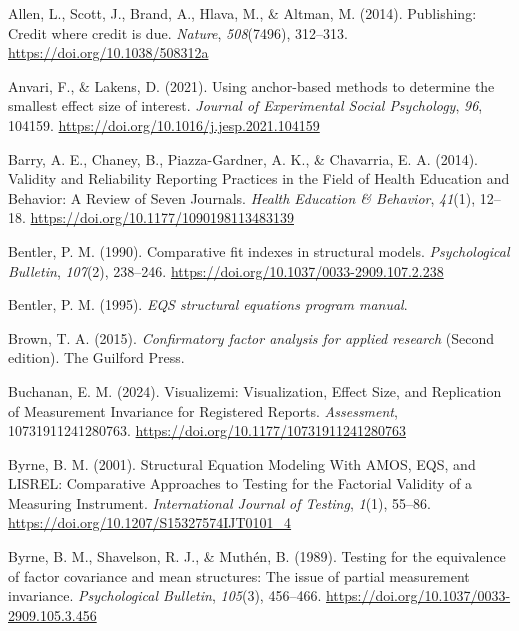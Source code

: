 \documentclass[
  english,
  man]{apa7}
\newlength{\cslhangindent}
\newenvironment{CSLReferences}[2] %
 {\begin{list}{}{%
  \setlength{\itemindent}{0pt}
  \setlength{\leftmargin}{0pt}
  \setlength{\parsep}{0pt}
  \ifodd #1
   \setlength{\leftmargin}{\cslhangindent}
   \setlength{\itemindent}{-1\cslhangindent}
  \fi
  \setlength{\itemsep}{#2\baselineskip}}}
 {\end{list}}
\begin{document}
\label{refs}
\begin{CSLReferences}{1}{0}
Allen, L., Scott, J., Brand, A., Hlava, M., \& Altman, M. (2014). Publishing: Credit where credit is due. \emph{Nature}, \emph{508}(7496), 312--313. \url{https://doi.org/10.1038/508312a}

Anvari, F., \& Lakens, D. (2021). Using anchor-based methods to determine the smallest effect size of interest. \emph{Journal of Experimental Social Psychology}, \emph{96}, 104159. \url{https://doi.org/10.1016/j.jesp.2021.104159}

Barry, A. E., Chaney, B., Piazza-Gardner, A. K., \& Chavarria, E. A. (2014). Validity and Reliability Reporting Practices in the Field of Health Education and Behavior: A Review of Seven Journals. \emph{Health Education \& Behavior}, \emph{41}(1), 12--18. \url{https://doi.org/10.1177/1090198113483139}

Bentler, P. M. (1990). Comparative fit indexes in structural models. \emph{Psychological Bulletin}, \emph{107}(2), 238--246. \url{https://doi.org/10.1037/0033-2909.107.2.238}

Bentler, P. M. (1995). \emph{EQS structural equations program manual}.

Brown, T. A. (2015). \emph{Confirmatory factor analysis for applied research} (Second edition). The Guilford Press.

Buchanan, E. M. (2024). Visualizemi: Visualization, Effect Size, and Replication of Measurement Invariance for Registered Reports. \emph{Assessment}, 10731911241280763. \url{https://doi.org/10.1177/10731911241280763}

Byrne, B. M. (2001). Structural Equation Modeling With AMOS, EQS, and LISREL: Comparative Approaches to Testing for the Factorial Validity of a Measuring Instrument. \emph{International Journal of Testing}, \emph{1}(1), 55--86. \url{https://doi.org/10.1207/S15327574IJT0101_4}

Byrne, B. M., Shavelson, R. J., \& Muthén, B. (1989). Testing for the equivalence of factor covariance and mean structures: The issue of partial measurement invariance. \emph{Psychological Bulletin}, \emph{105}(3), 456--466. \url{https://doi.org/10.1037/0033-2909.105.3.456}


\end{CSLReferences}
\end{document}
